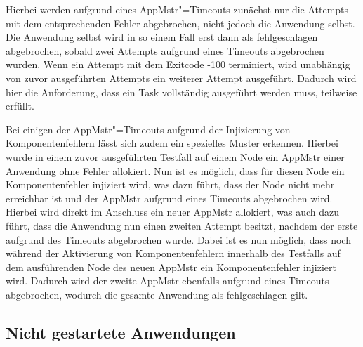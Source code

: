 Hierbei werden aufgrund eines \gls{AppMstr}"=Timeouts zunächst nur die Attempts mit dem entsprechenden Fehler abgebrochen, nicht jedoch die Anwendung selbst.
Die Anwendung selbst wird in so einem Fall erst dann als fehlgeschlagen abgebrochen, sobald zwei Attempts aufgrund eines Timeouts abgebrochen wurden.
Wenn ein Attempt mit dem Exitcode -100 terminiert, wird unabhängig von zuvor ausgeführten Attempts ein weiterer Attempt ausgeführt.
Dadurch wird hier die Anforderung, dass ein Task vollständig ausgeführt werden muss, teilweise erfüllt.

Bei einigen der \gls{AppMstr}"=Timeouts aufgrund der Injizierung von Komponentenfehlern lässt sich zudem ein spezielles Muster erkennen.
Hierbei wurde in einem zuvor ausgeführten Testfall auf einem Node ein \gls{AppMstr} einer Anwendung ohne Fehler allokiert.
Nun ist es möglich, dass für diesen Node ein Komponentenfehler injiziert wird, was dazu führt, dass der Node nicht mehr erreichbar ist und der \gls{AppMstr} aufgrund eines Timeouts abgebrochen wird.
Hierbei wird direkt im Anschluss ein neuer \gls{AppMstr} allokiert, was auch dazu führt, dass die Anwendung nun einen zweiten Attempt besitzt, nachdem der erste aufgrund des Timeouts abgebrochen wurde.
Dabei ist es nun möglich, dass noch während der Aktivierung von Komponentenfehlern innerhalb des Testfalls auf dem ausführenden Node des neuen \gls{AppMstr} ein Komponentenfehler injiziert wird.
Dadurch wird der zweite \gls{AppMstr} ebenfalls aufgrund eines Timeouts abgebrochen, wodurch die gesamte Anwendung als fehlgeschlagen gilt.

\subsection{Nicht gestartete Anwendungen}
\label{subsec:notStartedApps}

